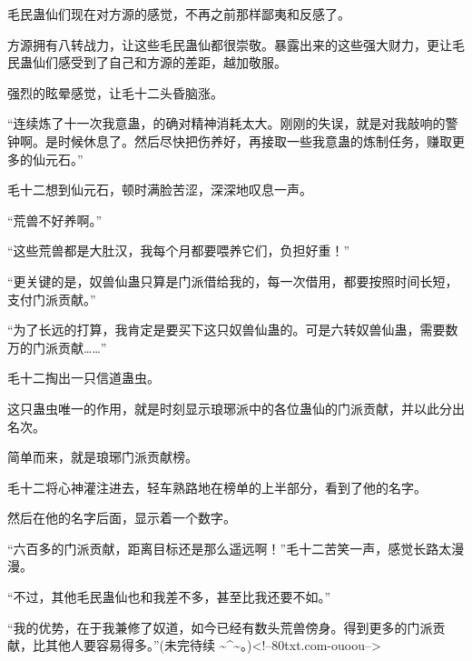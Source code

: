 \begin{this_body}
毛民蛊仙们现在对方源的感觉，不再之前那样鄙夷和反感了。

方源拥有八转战力，让这些毛民蛊仙都很崇敬。暴露出来的这些强大财力，更让毛民蛊仙们感受到了自己和方源的差距，越加敬服。

强烈的眩晕感觉，让毛十二头昏脑涨。

“连续炼了十一次我意蛊，的确对精神消耗太大。刚刚的失误，就是对我敲响的警钟啊。是时候休息了。然后尽快把伤养好，再接取一些我意蛊的炼制任务，赚取更多的仙元石。”

毛十二想到仙元石，顿时满脸苦涩，深深地叹息一声。

“荒兽不好养啊。”

“这些荒兽都是大肚汉，我每个月都要喂养它们，负担好重！”

“更关键的是，奴兽仙蛊只算是门派借给我的，每一次借用，都要按照时间长短，支付门派贡献。”

“为了长远的打算，我肯定是要买下这只奴兽仙蛊的。可是六转奴兽仙蛊，需要数万的门派贡献……”

毛十二掏出一只信道蛊虫。

这只蛊虫唯一的作用，就是时刻显示琅琊派中的各位蛊仙的门派贡献，并以此分出名次。

简单而来，就是琅琊门派贡献榜。

毛十二将心神灌注进去，轻车熟路地在榜单的上半部分，看到了他的名字。

然后在他的名字后面，显示着一个数字。

“六百多的门派贡献，距离目标还是那么遥远啊！”毛十二苦笑一声，感觉长路太漫漫。

“不过，其他毛民蛊仙也和我差不多，甚至比我还要不如。”

“我的优势，在于我兼修了奴道，如今已经有数头荒兽傍身。得到更多的门派贡献，比其他人要容易得多。”(未完待续 \~{}\^{}\~{}。)<!--80txt.com-ouoou-->

\end{this_body}

